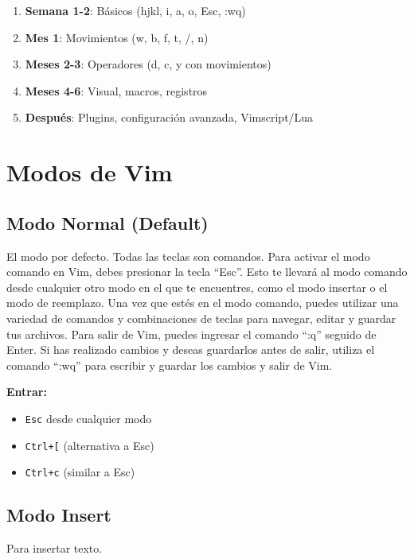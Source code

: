 \documentclass[
  doc,
  floatsintext,
  longtable,
  a4paper,
  nolmodern,
  notxfonts,
  notimes,
  12pt,
  colorlinks=true,linkcolor=blue,citecolor=blue,urlcolor=blue]{apa7}
\providecommand{\tightlist}{%
  \setlength{\itemsep}{0pt}\setlength{\parskip}{0pt}}
\begin{document}
\begin{enumerate}
\def\labelenumi{\arabic{enumi}.}
\tightlist
\item
  \textbf{Semana 1-2}: Básicos (hjkl, i, a, o, Esc, :wq)
\item
  \textbf{Mes 1}: Movimientos (w, b, f, t, /, n)
\item
  \textbf{Meses 2-3}: Operadores (d, c, y con movimientos)
\item
  \textbf{Meses 4-6}: Visual, macros, registros
\item
  \textbf{Después}: Plugins, configuración avanzada, Vimscript/Lua
\end{enumerate}

\section{Modos de Vim}\label{modos-de-vim}

\subsection{Modo Normal (Default)}\label{modo-normal-default}

El modo por defecto. Todas las teclas son comandos. Para activar el modo
comando en Vim, debes presionar la tecla ``Esc''. Esto te llevará al
modo comando desde cualquier otro modo en el que te encuentres, como el
modo insertar o el modo de reemplazo. Una vez que estés en el modo
comando, puedes utilizar una variedad de comandos y combinaciones de
teclas para navegar, editar y guardar tus archivos. Para salir de Vim,
puedes ingresar el comando ``:q'' seguido de Enter. Si has realizado
cambios y deseas guardarlos antes de salir, utiliza el comando ``:wq''
para escribir y guardar los cambios y salir de Vim.

\textbf{Entrar:}

\begin{itemize}
\tightlist
\item
  \texttt{Esc} desde cualquier modo
\item
  \texttt{Ctrl+{[}} (alternativa a Esc)
\item
  \texttt{Ctrl+c} (similar a Esc)
\end{itemize}

\subsection{Modo Insert}\label{modo-insert}

Para insertar texto.
\end{document}
